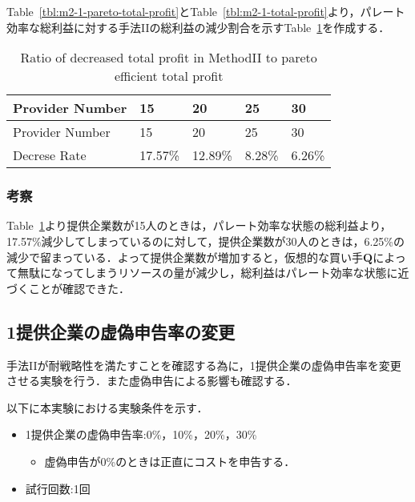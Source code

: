 Table~\ref{tbl:m2-1-pareto-total-profit}とTable~\ref{tbl:m2-1-total-profit}より，パレート効率な総利益に対する手法IIの総利益の減少割合を示すTable~\ref{tbl:m2-1-profit-decreased}を作成する．

\hypertarget{tbl:m2-1-profit-decreased}{}
\begin{longtable}[H]{@{}lllll@{}}
\caption{\label{tbl:m2-1-profit-decreased}Ratio of decreased total
profit in MethodII to pareto efficient total profit}\tabularnewline
\toprule
Provider Number & 15 & 20 & 25 & 30\tabularnewline
\midrule
\endfirsthead
\toprule
Provider Number & 15 & 20 & 25 & 30\tabularnewline
\midrule
\endhead
Decrese Rate & 17.57\% & 12.89\% & 8.28\% & 6.26\%\tabularnewline
\bottomrule
\end{longtable}

\hypertarget{ux8003ux5bdf-4}{%
\subsubsection{考察}\label{ux8003ux5bdf-4}}

Table~\ref{tbl:m2-1-profit-decreased}より提供企業数が15人のときは，パレート効率な状態の総利益より，17.57\%減少してしまっているのに対して，提供企業数が30人のときは，6.25\%の減少で留まっている．よって提供企業数が増加すると，仮想的な買い手\(\boldsymbol{Q}\)によって無駄になってしまうリソースの量が減少し，総利益はパレート効率な状態に近づくことが確認できた．

\hypertarget{ux63d0ux4f9bux4f01ux696dux306eux865aux507dux7533ux544aux7387ux306eux5909ux66f4-1}{%
\subsection{1提供企業の虚偽申告率の変更}\label{ux63d0ux4f9bux4f01ux696dux306eux865aux507dux7533ux544aux7387ux306eux5909ux66f4-1}}

手法IIが耐戦略性を満たすことを確認する為に，1提供企業の虚偽申告率を変更させる実験を行う．また虚偽申告による影響も確認する．

以下に本実験における実験条件を示す．

\begin{itemize}
\tightlist
\item
  1提供企業の虚偽申告率:0\%，10\%，20\%，30\%

  \begin{itemize}
  \tightlist
  \item
    虚偽申告が0\%のときは正直にコストを申告する．
  \end{itemize}
\item
  試行回数:1回
\end{itemize}

